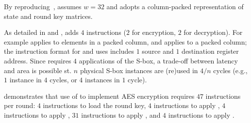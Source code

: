 
By reproducing~\cite[Section 4.2]{TilGro:06},
assumes 
$w = 32$
and adopts a 
column-packed 
representation of state and round key matrices.

As detailed in
and
,
adds
$ 4$
instructions ($2$ for encryption, $2$ for decryption).
For example
applies 
  to elements in   a packed column,
and
applies 
 to               a packed column;
the instruction format for
and
uses 
includes $1$ source and $1$ destination register address.
Since 
requires $4$ applications of the S-box, a trade-off between latency and
area is possible st. 
$n$ physical S-box instances are (re)used in $4/n$ cycles
(e.g., $1$ instance in $4$ cycles, or $4$ instances in $1$ cycle).

demonstrates that use of  to implement AES encryption requires
$47$ instructions per round:
$ 4$            
     instructions to load the round key,
$ 4$            
     instructions to apply ,
$ 4$   
     instructions to apply ,
$31$ instructions to apply ,
and
$ 4$   
     instructions to apply .

